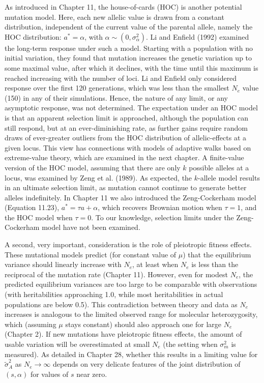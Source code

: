 \documentclass{article}
\begin{document}
{As introduced in Chapter 11, the house-of-cards (HOC) is another potential mutation model. Here, each new allelic value is drawn from a constant distribution, independent of the current value of the parental allele, namely the HOC distribution:  $ a^* = \alpha $, with  $ \alpha \sim (0, \sigma_\alpha^2) $. Li and Enfield (1992) examined the long-term response under such a model. Starting with a population with no initial variation, they found that mutation increases the genetic variation up to some maximal value, after which it declines, with the time until this maximum is reached increasing with the number of loci. Li and Enfield only considered response over the first 120 generations, which was less than the smallest  $ N_e $ value (150) in any of their simulations. Hence, the nature of any limit, or any asymptotic response, was not determined. The expectation under an HOC model is that an apparent selection limit is approached, although the population can still respond, but at an ever-diminishing rate, as further gains require random draws of ever-greater outliers from the HOC distribution of allelic-effects at a given locus. This view has connections with models of adaptive walks based on extreme-value theory, which are examined in the next chapter. A finite-value version of the HOC model, assuming that there are only  $ k $ possible alleles at a locus, was examined by Zeng et al. (1989). As expected, the  $ k $-allele model results in an ultimate selection limit, as mutation cannot continue to generate better alleles indefinitely. In Chapter 11 we also introduced the Zeng-Cockerham model (Equation 11.23),  $ a^* = \tau a + \alpha $, which recovers Brownian motion when  $ \tau = 1 $, and the HOC model when  $ \tau = 0 $. To our knowledge, selection limits under the Zeng-Cockerham model have not been examined.

A second, very important, consideration is the role of pleiotropic fitness effects. These mutational models predict (for constant value of  $ \mu $) that the equilibrium variance should linearly increase with  $ N_e $, at least when  $ N_e $ is less than the reciprocal of the mutation rate (Chapter 11). However, even for modest  $ N_e $, the predicted equilibrium variances are too large to be comparable with observations (with heritabilities approaching 1.0, while most heritabilities in actual populations are below 0.5). This contradiction between theory and data as  $ N_e $ increases is analogous to the limited observed range for molecular heterozygosity, which (assuming  $ \mu $ stays constant) should also approach one for large  $ N_e $ (Chapter 2). If new mutations have pleiotropic fitness effects, the amount of usable variation will be overestimated at small  $ N_e $ (the setting when  $ \sigma_m^2 $ is measured). As detailed in Chapter 28, whether this results in a limiting value for  $ \widetilde{\sigma}_A^2 $ as  $ N_e \to \infty $ depends on very delicate features of the joint distribution of  $ (s, \alpha) $ for values of  $ s $ near zero.

}
\end{document}
